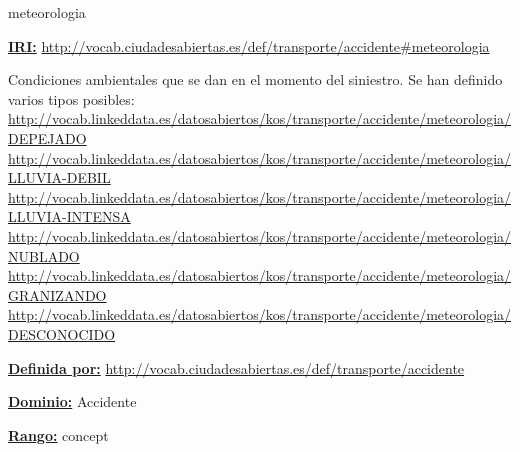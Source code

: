 \begin{mybox}{meteorologia}
\begin{flushleft}
\underline{\textbf{IRI:}}
\url{http://vocab.ciudadesabiertas.es/def/transporte/accidente#meteorologia}
\newline

Condiciones ambientales que se dan en el momento del siniestro. Se han definido varios tipos posibles:
\newline \url{http://vocab.linkeddata.es/datosabiertos/kos/transporte/accidente/meteorologia/DEPEJADO}
\newline \url{http://vocab.linkeddata.es/datosabiertos/kos/transporte/accidente/meteorologia/LLUVIA-DEBIL}
\newline \url{http://vocab.linkeddata.es/datosabiertos/kos/transporte/accidente/meteorologia/LLUVIA-INTENSA}
\newline \url{http://vocab.linkeddata.es/datosabiertos/kos/transporte/accidente/meteorologia/NUBLADO}
\newline \url{http://vocab.linkeddata.es/datosabiertos/kos/transporte/accidente/meteorologia/GRANIZANDO}
\newline \url{http://vocab.linkeddata.es/datosabiertos/kos/transporte/accidente/meteorologia/DESCONOCIDO}
\newline

\underline{\textbf{Definida por:}}\newline
\url{http://vocab.ciudadesabiertas.es/def/transporte/accidente}
\newline

\underline{\textbf{Dominio:}}  Accidente
\newline

\underline{\textbf{Rango:}} concept
\newline

\end{flushleft}
\end{mybox}


